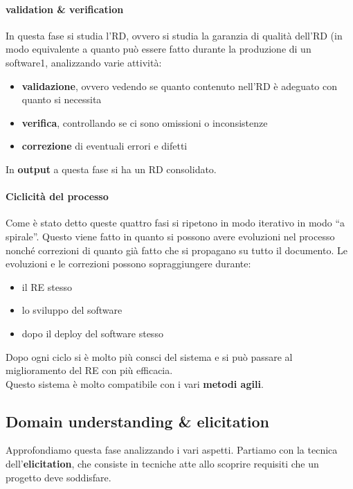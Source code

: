 \documentclass[a4paper,12pt, oneside]{book}
\begin{document}
\paragraph{validation \& verification}
In questa fase si studia l'RD, ovvero si studia la garanzia di qualità dell'RD
(in modo equivalente a quanto può essere fatto durante la produzione di un
software1, analizzando varie attività: 
\begin{itemize}
  \item \textbf{validazione}, ovvero vedendo se quanto contenuto nell'RD è
  adeguato con quanto si necessita
  \item \textbf{verifica}, controllando se ci sono omissioni o inconsistenze
  \item \textbf{correzione} di eventuali errori e difetti
\end{itemize}
In \textbf{output} a questa fase si ha un RD consolidato.
\paragraph{Ciclicità del processo}
Come è stato detto queste quattro fasi si ripetono in modo iterativo in modo ``a
spirale''. Questo viene fatto in quanto si possono avere evoluzioni nel processo
nonché correzioni di quanto già fatto che si propagano su tutto il documento. Le
evoluzioni e le correzioni possono sopraggiungere durante:
\begin{itemize}
  \item il RE stesso
  \item lo sviluppo del software
  \item dopo il deploy del software stesso
\end{itemize}
Dopo ogni ciclo si è molto più consci del sistema e si può passare al
miglioramento del RE con più efficacia.\\
Questo sistema è molto compatibile con i vari \textbf{metodi agili}.
\subsection{Domain understanding \& elicitation}
Approfondiamo questa fase analizzando i vari aspetti. Partiamo con la tecnica
dell'\textbf{elicitation}, che consiste in tecniche atte allo scoprire requisiti
che un progetto deve soddisfare. 
\end{document}
